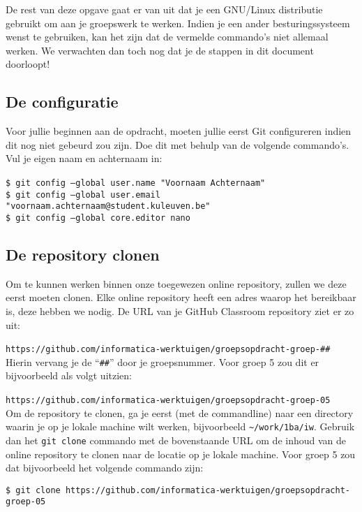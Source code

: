 \documentclass[a4paper]{article}
\begin{document}
De rest van deze opgave gaat er van uit dat je een GNU/Linux distributie gebruikt om aan je groepswerk te werken.
Indien je een ander besturingssysteem wenst te gebruiken, kan het zijn dat de vermelde commando’s niet allemaal werken.
We verwachten dan toch nog dat je de stappen in dit document doorloopt!


\subsection{De configuratie}
Voor jullie beginnen aan de opdracht, moeten jullie eerst Git configureren indien dit nog niet gebeurd zou zijn.
Doe dit met behulp van de volgende commando’s. Vul je eigen naam en achternaam in:

\break
\noindent
\texttt{\$ git config --global user.name "Voornaam Achternaam"} \\
\texttt{\$ git config --global user.email "voornaam.achternaam@student.kuleuven.be"} \\
\texttt{\$ git config --global core.editor nano} \\


\subsection{De repository clonen}
Om te kunnen werken binnen onze toegewezen online repository, zullen we deze eerst moeten clonen.
Elke online repository heeft een adres waarop het bereikbaar is, deze hebben we nodig.
De URL van je GitHub Classroom repository ziet er zo uit:

\texttt{https://github.com/informatica-werktuigen/groepsopdracht-groep-\#\#} \\

Hierin vervang je de ``\texttt{\#\#}'' door je groepsnummer.
Voor groep 5 zou dit er bijvoorbeeld als volgt uitzien:

\texttt{https://github.com/informatica-werktuigen/groepsopdracht-groep-05} \\

Om de repository te clonen, ga je eerst (met de commandline) naar een directory waarin je op je lokale machine wilt werken, bijvoorbeeld \texttt{\textasciitilde/work/1ba/iw}.
Gebruik dan het \texttt{git clone} commando met de bovenstaande URL om de inhoud van de online repository te clonen naar de locatie op je lokale machine.
Voor groep 5 zou dat bijvoorbeeld het volgende commando zijn:

\texttt{\$ git clone https://github.com/informatica-werktuigen/groepsopdracht-groep-05} \\
\end{document}
